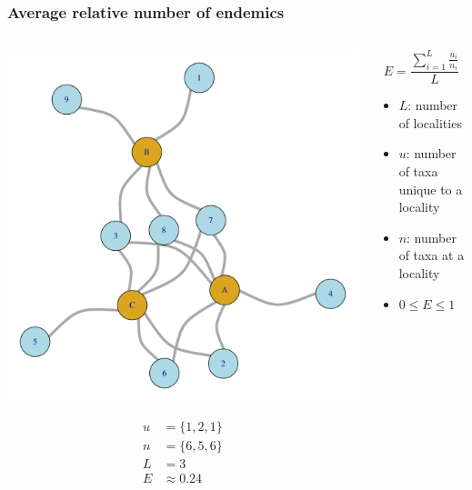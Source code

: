 \documentclass{beamer}
\begin{document}
\begin{frame}
  \frametitle{Average relative number of endemics}

  \begin{columns}
    \begin{column}{0.5\textwidth}
      \begin{center}
        \includegraphics[height = 0.5\textheight, width = \textwidth, keepaspectratio = true]{figure/sim_graph}

        \begin{align*}
          u &= \{1, 2, 1\}\\
          n &= \{6, 5, 6\}\\
          L &= 3\\
          E &\approx 0.24
        \end{align*}
      \end{center}
    \end{column}
    \begin{column}{0.5\textwidth}
      \[
        E = \frac{\sum_{i = 1}^{L} \frac{u_{i}}{n_{i}}}{L}
      \]

      \begin{itemize}
        \item \(L\): number of localities
        \item \(u\): number of taxa unique to a locality
        \item \(n\): number of taxa at a locality
        \item \(0 \leq E \leq 1\)
      \end{itemize}
    \end{column}
  \end{columns}
\end{frame}
\end{document}
